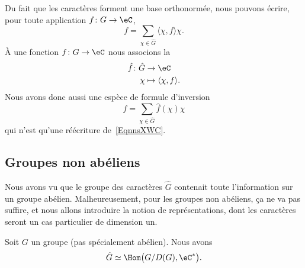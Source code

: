 Du fait que les caractères forment une base orthonormée, nous pouvons écrire, pour toute application \( f\colon G\to \eC\),
\begin{equation}    \label{EqnnsXWC}
    f=\sum_{\chi\in\hat G}\langle \chi, f\rangle \chi.
\end{equation}
À une fonction \( f\colon G\to \eC\) nous associons la 
\begin{equation}
    \begin{aligned}
        \hat f\colon \hat G&\to \eC \\
        \chi&\mapsto \langle \chi, f\rangle .
    \end{aligned}
\end{equation}
Nous avons donc aussi une espèce de formule d'inversion
\begin{equation}
    f=\sum_{\chi\in\hat G}\hat f(\chi)\chi
\end{equation}
qui n'est qu'une réécriture de~\ref{EqnnsXWC}.

\subsection{Groupes non abéliens}

Nous avons vu que le groupe des caractères \( \hat G\) contenait toute l'information sur un groupe abélien. Malheureusement, pour les groupes non abéliens, ça ne va pas suffire, et nous allons introduire la notion de représentations, dont les caractères seront un cas particulier de dimension un.

\begin{proposition}
    Soit \( G\) un groupe (pas spécialement abélien). Nous avons
    \begin{equation}
        \hat G\simeq\Hom\big( G/D(G),\eC^* \big).
    \end{equation}
\end{proposition}

